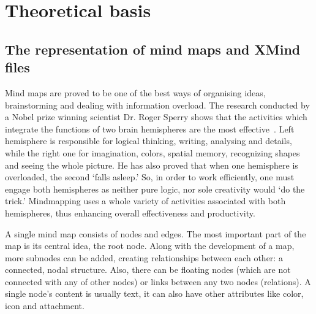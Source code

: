 %
%
%
%
%

\chapter{Theoretical basis}
\label{chap:theory}

\section{The representation of mind maps and XMind files}
\label{sec:xmind}

Mind maps are proved to be one of the best ways of organising ideas, brainstorming and dealing with information overload. The research conducted by a Nobel prize winning scientist Dr. Roger Sperry shows that the activities which integrate the functions of two brain hemispheres are the most effective~\cite{Voneida:1998:Sperry}. Left hemisphere is responsible for logical thinking, writing, analysing and details, while the right one for imagination, colors, spatial memory, recognizing shapes and seeing the whole picture. He has also proved that when one hemisphere is overloaded, the second `falls asleep.' So, in order to work efficiently, one must engage both hemispheres as neither pure logic, nor sole creativity would `do the trick.' Mindmapping uses a whole variety of activities associated with both hemispheres, thus enhancing overall effectiveness and productivity.

A single mind map consists of nodes and edges. The most important part of the map is its central idea, the root node. Along with the development of a map, more subnodes can be added, creating relationships between each other: a connected, nodal structure. Also, there can be floating nodes (which are not connected with any of other nodes) or links between any two nodes (relations). A single node's content is usually text, it can also have other attributes like color,  icon and attachment.

